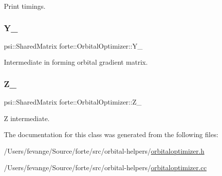 Print timings. 

\mbox{\label{classforte_1_1_orbital_optimizer_a3616eec66dda962613054ce8c792505d}} 
\subsubsection{\texorpdfstring{Y\+\_\+}{Y\_}}
{\footnotesize\ttfamily psi\+::\+Shared\+Matrix forte\+::\+Orbital\+Optimizer\+::\+Y\+\_\+\hspace{0.3cm}{\ttfamily [protected]}}



Intermediate in forming orbital gradient matrix. 

\mbox{\label{classforte_1_1_orbital_optimizer_aabb269507aaeefe6b56f918aa26c1768}} 
\subsubsection{\texorpdfstring{Z\+\_\+}{Z\_}}
{\footnotesize\ttfamily psi\+::\+Shared\+Matrix forte\+::\+Orbital\+Optimizer\+::\+Z\+\_\+\hspace{0.3cm}{\ttfamily [protected]}}



Z intermediate. 



The documentation for this class was generated from the following files\+:\begin{DoxyCompactItemize}
\item 
/\+Users/fevange/\+Source/forte/src/orbital-\/helpers/\mbox{\hyperlink{orbitaloptimizer_8h}{orbitaloptimizer.\+h}}\item 
/\+Users/fevange/\+Source/forte/src/orbital-\/helpers/\mbox{\hyperlink{orbitaloptimizer_8cc}{orbitaloptimizer.\+cc}}\end{DoxyCompactItemize}
